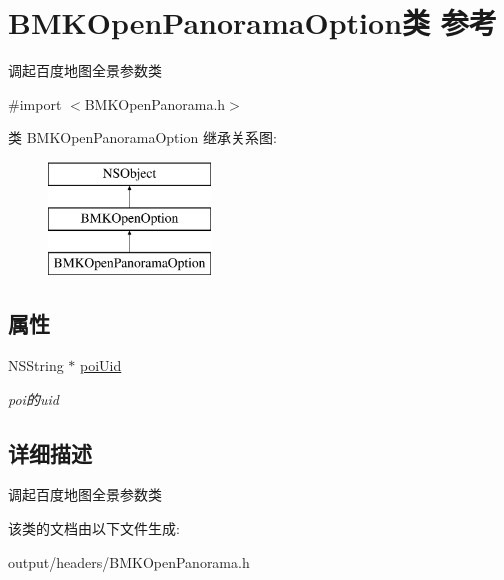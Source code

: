 \hypertarget{interface_b_m_k_open_panorama_option}{}\section{B\+M\+K\+Open\+Panorama\+Option类 参考}
\label{interface_b_m_k_open_panorama_option}


调起百度地图全景参数类  




{\ttfamily \#import $<$B\+M\+K\+Open\+Panorama.\+h$>$}

类 B\+M\+K\+Open\+Panorama\+Option 继承关系图\+:\begin{figure}[H]
\begin{center}
\leavevmode
\includegraphics[height=3.000000cm]{interface_b_m_k_open_panorama_option}
\end{center}
\end{figure}
\subsection*{属性}
\begin{DoxyCompactItemize}
\item 
\hypertarget{interface_b_m_k_open_panorama_option_abb78bf83c1d4ee5e8ba09254125f0856}{}N\+S\+String $\ast$ \hyperlink{interface_b_m_k_open_panorama_option_abb78bf83c1d4ee5e8ba09254125f0856}{poi\+Uid}\label{interface_b_m_k_open_panorama_option_abb78bf83c1d4ee5e8ba09254125f0856}

\begin{DoxyCompactList}\small\item\em poi的uid \end{DoxyCompactList}\end{DoxyCompactItemize}


\subsection{详细描述}
调起百度地图全景参数类 

该类的文档由以下文件生成\+:\begin{DoxyCompactItemize}
\item 
output/headers/B\+M\+K\+Open\+Panorama.\+h\end{DoxyCompactItemize}
